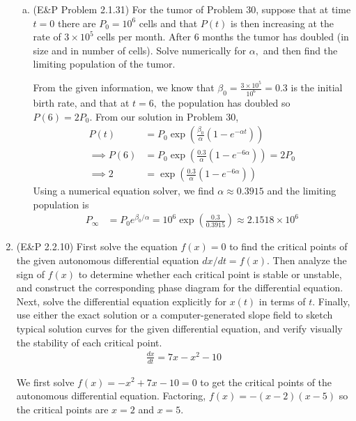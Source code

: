 \documentclass{article}
\begin{document}
\begin{enumerate}
\begin{enumerate}[(a)]
			\item (E\&P Problem 2.1.31) For the tumor of Problem 30, suppose that at time $t=0$ there are $P_0=10^6$ cells and that $P(t)$ is then increasing at the rate of $3\times 10^5$ cells per month. After 6 months the tumor has doubled (in size and in number of cells). Solve numerically for $\alpha,$ and then find the limiting population of the tumor.
				\begin{soln}
					From the given information, we know that $\beta_0 = \frac{3\times 10^5}{10^6} = 0.3$ is the initial birth rate, and that at $t=6,$ the population has doubled so $P(6)=2P_0.$ From our solution in Problem 30,
					\begin{align*}
						P(t) &= P_0 \exp\left( \frac{\beta_0}{\alpha}(1-e^{-\alpha t}) \right) \\
						\implies P(6) &= P_0 \exp\left( \frac{0.3}{\alpha} (1-e^{-6\alpha})\right) = 2P_0 \\
						\implies 2 &= \exp\left( \frac{0.3}{\alpha}(1-e^{-6\alpha}) \right)
					\end{align*}
					Using a numerical equation solver, we find $\boxed{\alpha\approx0.3915}$ and the limiting population is
					\begin{align*}
						P_\infty &= P_0 e^{\beta_0/\alpha} = 10^6 \exp\left( \frac{0.3}{0.3915} \right) \approx \boxed{2.1518\times 10^6}
					\end{align*}
				\end{soln}

		\end{enumerate}

		\newpage
	\item (E\&P 2.2.10) First solve the equation $f(x)=0$ to find the critical points of the given autonomous differential equation $dx/dt=f(x).$ Then analyze the sign of $f(x)$ to determine whether each critical point is stable or unstable, and construct the corresponding phase diagram for the differential equation. Next, solve the differential equation explicitly for $x(t)$ in terms of $t.$ Finally, use either the exact solution or a computer-generated slope field to sketch typical solution curves for the given differential equation, and verify visually the stability of each critical point.
		\begin{align*}
			\frac{dx}{dt} = 7x-x^2-10
		\end{align*}
		\begin{soln}
			We first solve $f(x)=-x^2+7x-10 = 0$ to get the critical points of the autonomous differential equation. Factoring, $f(x)=-(x-2)(x-5)$ so the critical points are $x=2$ and $x=5.$


\end{soln}
\end{enumerate}
\end{document}
